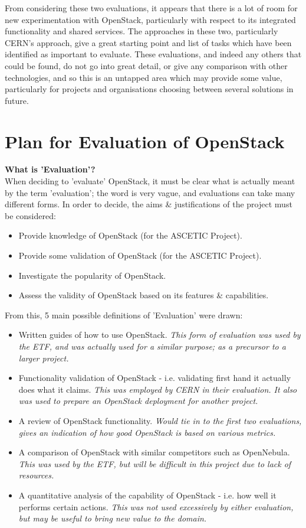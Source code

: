 From considering these two evaluations, it appears that there is a lot of room for new experimentation with OpenStack, particularly with respect to its integrated functionality and shared services. The approaches in these two, particularly CERN's approach, give a great starting point and list of tasks which have been identified as important to evaluate. These evaluations, and indeed any others that could be found, do not go into great detail, or give any comparison with other technologies, and so this is an untapped area which may provide some value, particularly for projects and organisations choosing between several solutions in future.  

\section{Plan for Evaluation of OpenStack}
\textbf{What is 'Evaluation'?}\\
When deciding to 'evaluate' OpenStack, it must be clear what is actually meant by the term 'evaluation'; the word is very vague, and evaluations can take many different forms. In order to decide, the aims \& justifications of the project must be considered:

\begin{itemize}
\itemsep0em
\item Provide knowledge of OpenStack (for the ASCETIC Project).
\item Provide some validation of OpenStack (for the ASCETIC Project).
\item Investigate the popularity of OpenStack.
\item Assess the validity of OpenStack based on its features \& capabilities.
\end{itemize}

From this, 5 main possible definitions of 'Evaluation' were drawn:

\begin{itemize}
\itemsep0em
\item Written guides of how to use OpenStack.
		\textit{This form of evaluation was used by the ETF, and was actually used for a similar purpose; as a precursor to a larger project.}
\item Functionality validation of OpenStack - i.e. validating first hand it actually does what it claims.
\textit{This was employed by CERN in their evaluation. It also was used to prepare an OpenStack deployment for another project.}
\item A review of OpenStack functionality.
\textit{Would tie in to the first two evaluations, gives an indication of how good OpenStack is based on various metrics.}
\item A comparison of OpenStack with similar competitors such as OpenNebula.
\textit{This was used by the ETF, but will be difficult in this project due to lack of resources.}
\item  A quantitative analysis of the capability of OpenStack - i.e. how well it performs certain actions.
\textit{This was not used excessively by either evaluation, but may be useful to bring new value to the domain.}
\end{itemize}

